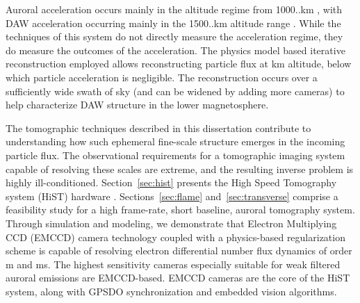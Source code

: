 Auroral acceleration occurs mainly in the altitude regime from 1000..\unit[40000]{km} \citep{lysak2011}, with DAW acceleration occurring mainly in the 1500..\unit[7000]{km} altitude range \citep{semeter2012}.
While the techniques of this system do not directly measure the acceleration regime, they do measure the outcomes of the acceleration.
The physics model based iterative reconstruction employed allows reconstructing particle flux at \unit[1000]{km} altitude, below which particle acceleration is negligible.
The reconstruction occurs over a sufficiently wide swath of sky (and can be widened by adding more cameras) to help characterize DAW structure in the lower magnetosphere.

The tomographic techniques described in this dissertation contribute to understanding how such ephemeral fine-scale structure emerges in the incoming particle flux.
The observational requirements for a tomographic imaging system capable of resolving these scales are extreme, and the resulting inverse problem is highly ill-conditioned.
Section~\ref{sec:hist} presents the High Speed Tomography system (HiST) hardware \citep{hirsch2016}.
Sections~\ref{sec:flame} and~\ref{sec:transverse} comprise a feasibility study for a high frame-rate, short baseline, auroral tomography system.
Through simulation and modeling, we demonstrate that Electron Multiplying CCD (EMCCD) camera technology coupled with a physics-based regularization scheme is capable of resolving electron differential number flux dynamics of order \unit[100]{m} and \unit[10]{ms}.
The highest sensitivity cameras especially suitable for weak filtered auroral emissions are EMCCD-based.
EMCCD cameras are the core of the HiST system, along with GPSDO synchronization and embedded vision algorithms.
